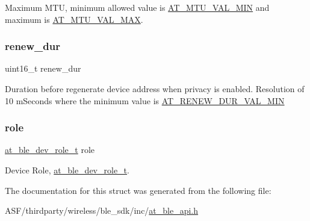 Maximum M\+TU, minimum allowed value is \mbox{\hyperlink{at__ble__api_8h_a00d6694a3d0bdcc16a59e6da4d7fbb71}{A\+T\+\_\+\+M\+T\+U\+\_\+\+V\+A\+L\+\_\+\+M\+IN}} and maximum is \mbox{\hyperlink{at__ble__api_8h_aa5fe6d41c61adba5b395dafc27f35099}{A\+T\+\_\+\+M\+T\+U\+\_\+\+V\+A\+L\+\_\+\+M\+AX}}. 

\mbox{\label{structat__ble__dev__config__t_a73fd1f4e7ca670060f9433df0eab0fbb}} 
\subsubsection{\texorpdfstring{renew\_dur}{renew\_dur}}
{\footnotesize\ttfamily uint16\+\_\+t renew\+\_\+dur}

Duration before regenerate device address when privacy is enabled. Resolution of 10 m\+Seconds where the minimum value is \mbox{\hyperlink{at__ble__api_8h_a50b36406164b418c4de24014c3bf2a7d}{A\+T\+\_\+\+R\+E\+N\+E\+W\+\_\+\+D\+U\+R\+\_\+\+V\+A\+L\+\_\+\+M\+IN}} \mbox{\label{structat__ble__dev__config__t_a6cf060150e1e825208151bf857dd2f08}} 
\subsubsection{\texorpdfstring{role}{role}}
{\footnotesize\ttfamily \mbox{\hyperlink{at__ble__api_8h_ad15e38aadd54f5fc3ab8a75b35ae476a}{at\+\_\+ble\+\_\+dev\+\_\+role\+\_\+t}} role}



Device Role, \mbox{\hyperlink{at__ble__api_8h_ad15e38aadd54f5fc3ab8a75b35ae476a}{at\+\_\+ble\+\_\+dev\+\_\+role\+\_\+t}}. 



The documentation for this struct was generated from the following file\+:\begin{DoxyCompactItemize}
\item 
A\+S\+F/thirdparty/wireless/ble\+\_\+sdk/inc/\mbox{\hyperlink{at__ble__api_8h}{at\+\_\+ble\+\_\+api.\+h}}\end{DoxyCompactItemize}
